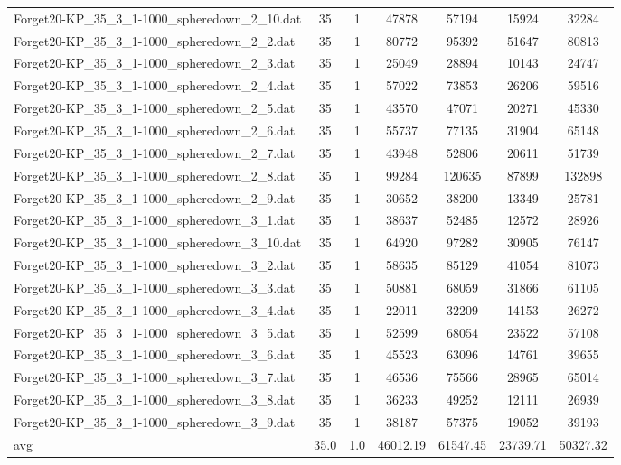 \begin{table}[!ht]
\begin{tabular}{lcccccc}
Forget20-KP\_35\_3\_1-1000\_spheredown\_2\_10.dat & 35 & 1 & 47878 & 57194 & 15924 & 32284 \\
Forget20-KP\_35\_3\_1-1000\_spheredown\_2\_2.dat & 35 & 1 & 80772 & 95392 & 51647 & 80813 \\
Forget20-KP\_35\_3\_1-1000\_spheredown\_2\_3.dat & 35 & 1 & 25049 & 28894 & 10143 & 24747 \\
Forget20-KP\_35\_3\_1-1000\_spheredown\_2\_4.dat & 35 & 1 & 57022 & 73853 & 26206 & 59516 \\
Forget20-KP\_35\_3\_1-1000\_spheredown\_2\_5.dat & 35 & 1 & 43570 & 47071 & 20271 & 45330 \\
Forget20-KP\_35\_3\_1-1000\_spheredown\_2\_6.dat & 35 & 1 & 55737 & 77135 & 31904 & 65148 \\
Forget20-KP\_35\_3\_1-1000\_spheredown\_2\_7.dat & 35 & 1 & 43948 & 52806 & 20611 & 51739 \\
Forget20-KP\_35\_3\_1-1000\_spheredown\_2\_8.dat & 35 & 1 & 99284 & 120635 & 87899 & 132898 \\
Forget20-KP\_35\_3\_1-1000\_spheredown\_2\_9.dat & 35 & 1 & 30652 & 38200 & 13349 & 25781 \\
Forget20-KP\_35\_3\_1-1000\_spheredown\_3\_1.dat & 35 & 1 & 38637 & 52485 & 12572 & 28926 \\
Forget20-KP\_35\_3\_1-1000\_spheredown\_3\_10.dat & 35 & 1 & 64920 & 97282 & 30905 & 76147 \\
Forget20-KP\_35\_3\_1-1000\_spheredown\_3\_2.dat & 35 & 1 & 58635 & 85129 & 41054 & 81073 \\
Forget20-KP\_35\_3\_1-1000\_spheredown\_3\_3.dat & 35 & 1 & 50881 & 68059 & 31866 & 61105 \\
Forget20-KP\_35\_3\_1-1000\_spheredown\_3\_4.dat & 35 & 1 & 22011 & 32209 & 14153 & 26272 \\
Forget20-KP\_35\_3\_1-1000\_spheredown\_3\_5.dat & 35 & 1 & 52599 & 68054 & 23522 & 57108 \\
Forget20-KP\_35\_3\_1-1000\_spheredown\_3\_6.dat & 35 & 1 & 45523 & 63096 & 14761 & 39655 \\
Forget20-KP\_35\_3\_1-1000\_spheredown\_3\_7.dat & 35 & 1 & 46536 & 75566 & 28965 & 65014 \\
Forget20-KP\_35\_3\_1-1000\_spheredown\_3\_8.dat & 35 & 1 & 36233 & 49252 & 12111 & 26939 \\
Forget20-KP\_35\_3\_1-1000\_spheredown\_3\_9.dat & 35 & 1 & 38187 & 57375 & 19052 & 39193 \\
\cline{1-9} avg & 35.0 & 1.0 & 46012.19& 61547.45 & 23739.71& 50327.32\\ \hline

\end{tabular}
\end{table}

